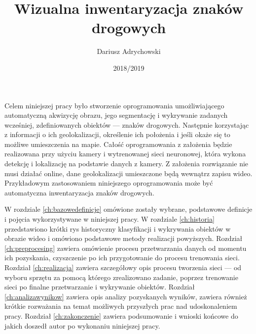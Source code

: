 \documentclass[openright]{xmgr}
\author   {Dariusz Adrychowski}
\title    {Wizualna inwentaryzacja znaków drogowych\todo{Uzupełnić tytuł po  uzgodnieniu}}
\date     {2018/2019}
\begin{document}
\begin{abstract}
\lipsum[1-4]
\end{abstract}


\maketitle

 \listoftodos

\introduction


Celem niniejszej pracy było stworzenie oprogramowania umożliwiającego automatyczną akwizycję obrazu, jego segmentację i wykrywanie zadanych wcześniej, zdefiniowanych obiektów --- znaków drogowych. Następnie korzystając z informacji o ich geolokalizacji, określenie ich położenia i jeśli okaże się to możliwe umieszczenia na mapie. Całość oprogramowania z założenia będzie realizowana przy użyciu kamery i wytrenowanej sieci neuronowej, która wykona detekcję i lokalizację na podstawie danych z kamery. Z założenia rozwiązanie nie musi działać online, dane geolokalizacji umieszczone będą wewnątrz zapisu wideo.
Przykładowym zastosowaniem niniejszego oprogramowania może być automatyczna inwentaryzacja znaków drogowych.

W rozdziale \ref{ch:bazowedefinicje} omówione zostały wybrane, podstawowe definicje i pojęcia wykorzystywane w niniejszej pracy. W rozdziale \ref{ch:historia} przedstawiono krótki rys historyczny klasyfikacji i wykrywania obiektów w obrazie wideo i omówiono podstawowe metody realizacji powyższych. Rozdział \ref{ch:preprocesing} zawiera omówienie procesu przetwarzania danych od momentu ich pozyskania, czyszczenie po ich przygotowanie do procesu trenowania sieci. Rozdział \ref{ch:realizacja} zawiera szczegółowy opis procesu tworzenia sieci --- od wyboru sprzętu za pomocą którego zrealizowano zadanie, poprzez trenowanie sieci po finalne przetwarzanie i wykrywanie obiektów. Rozdział \ref{ch:analizawynikow} zawiera opis analizy pozyskanych wyników, zawiera również krótkie rozważania na temat możliwych przyszłych prac nad udoskonaleniem pracy. Rozdział \ref{ch:zakonczenie} zawiera podsumowanie i wnioski końcowe do jakich doszedł autor po wykonaniu niniejszej pracy.




\end{document}
